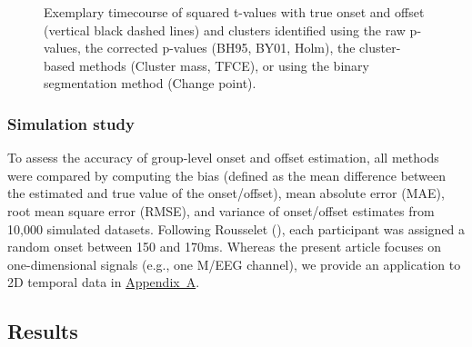 \documentclass[
  doc,
  floatsintext,
  longtable,
  a4paper,
  nolmodern,
  notxfonts,
  notimes,
  colorlinks=true,linkcolor=blue,citecolor=blue,urlcolor=blue]{apa7}
\begin{document}
\begin{figure}[!htb]

\caption{\label{fig-corrections}Exemplary timecourse of squared t-values
with true onset and offset (vertical black dashed lines) and clusters
identified using the raw p-values, the corrected p-values (BH95, BY01,
Holm), the cluster-based methods (Cluster mass, TFCE), or using the
binary segmentation method (Change point).}


\end{figure}%

\subsubsection{Simulation study}\label{simulation-study}

To assess the accuracy of group-level onset and offset estimation, all
methods were compared by computing the bias (defined as the mean
difference between the estimated and true value of the onset/offset),
mean absolute error (MAE), root mean square error (RMSE), and variance
of onset/offset estimates from 10,000 simulated datasets. Following
Rousselet (), each participant
was assigned a random onset between 150 and 170ms. Whereas the present
article focuses on one-dimensional signals (e.g., one M/EEG channel), we
provide an application to 2D temporal data in
\hyperref[apx-2D]{Appendix~A}.

\subsection{Results}\label{results}
\end{document}
